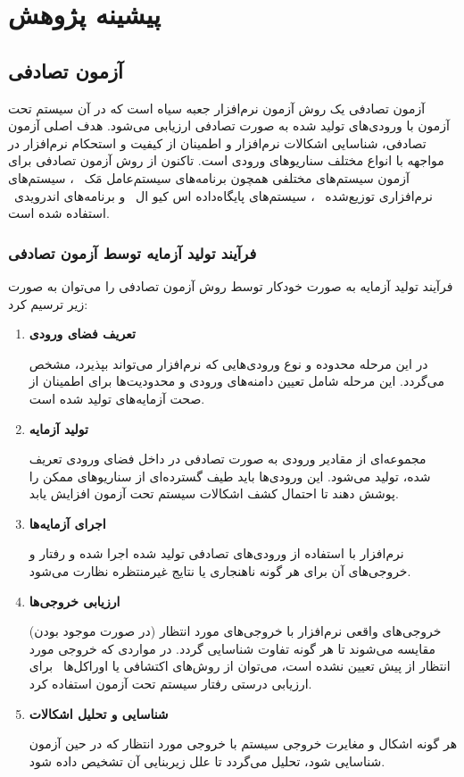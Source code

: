 \chapter{پیشینه پژوهش}\label{chapter3}

\section{آزمون تصادفی}
آزمون تصادفی
\cite{hamlet1994random}
 یک روش آزمون نرم‌افزار جعبه سیاه
  است که در آن سیستم تحت آزمون با ورودی‌های تولید شده به صورت تصادفی ارزیابی می‌شود. هدف اصلی آزمون تصادفی، شناسایی اشکالات نرم‌افزار و اطمینان از کیفیت و استحکام نرم‌افزار در مواجهه با انواع مختلف سناریوهای ورودی است. تاکنون از روش آزمون تصادفی برای آزمون سیستم‌های مختلفی همچون برنامه‌های سیستم‌عامل مَک~\cite{miller2006empirical}
 ، سیستم‌های نرم‌افزاری توزیع‌شده~\cite{regehr2005random}
  ، سیستم‌های پایگاه‌داده اس‌ کیو ال~\cite{bati2007genetic}
  و برنامه‌های اندرویدی~\cite{muangsiri2017random}
استفاده شده است.
\newpage
\subsection{فرآیند تولید آزمایه توسط آزمون تصادفی}

فرآیند تولید آزمایه به صورت خودکار توسط روش آزمون تصادفی را می‌توان به صورت زیر ترسیم کرد:

\begin{enumerate}
	\item \textbf{تعریف فضای ورودی}
	
	 در این مرحله محدوده و نوع ورودی‌هایی که نرم‌افزار می‌تواند بپذیرد، مشخص می‌گردد. این مرحله شامل تعیین دامنه‌های ورودی و محدودیت‌ها برای اطمینان از صحت آزمایه‌های تولید شده است.
	\item \textbf{تولید آزمایه}
	
	 مجموعه‌ای از مقادیر ورودی به صورت تصادفی در داخل فضای ورودی تعریف شده، تولید می‌شود. این ورودی‌ها باید طیف گسترده‌ای از سناریوهای ممکن را پوشش دهند تا احتمال کشف اشکالات سیستم تحت آزمون افزایش یابد.
	\item \textbf{اجرای آزمایه‌ها}
	
	 نرم‌افزار با استفاده از ورودی‌های تصادفی تولید شده اجرا شده و رفتار و خروجی‌های آن برای هر گونه ناهنجاری یا نتایج غیرمنتظره نظارت می‌شود.
	\item \textbf{ارزیابی خروجی‌ها}
	
	 خروجی‌های واقعی نرم‌افزار با خروجی‌های مورد انتظار (در صورت موجود بودن) مقایسه می‌شوند تا هر گونه تفاوت شناسایی گردد. در مواردی که خروجی مورد انتظار از پیش تعیین نشده است، می‌توان از روش‌های اکتشافی یا اوراکل‌ها~\cite{nardi2015survey}
	 برای ارزیابی درستی رفتار سیستم تحت آزمون استفاده کرد.
	\item \textbf{شناسایی و تحلیل اشکالات}
	
	 هر گونه اشکال و مغایرت خروجی سیستم با خروجی مورد انتظار که در حین آزمون شناسایی شود، تحلیل می‌گردد تا علل زیربنایی آن تشخیص داده شود.
	 
\end{enumerate}

